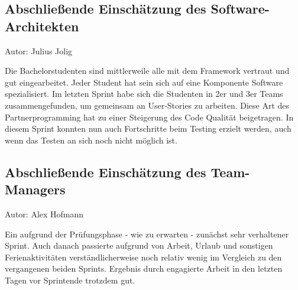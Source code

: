 \subsection{Abschließende Einschätzung des Software-Architekten}
{\small Autor: Julius Jolig}

Die Bachelorstudenten sind mittlerweile alle mit dem Framework vertraut und gut eingearbeitet. Jeder Student hat sein sich auf eine Komponente Software spezialisiert. Im letzten Sprint habe sich die Studenten in 2er und 3er Teams zusammengefunden, um gemeinsam an User-Stories zu arbeiten. Diese Art des Partnerprogramming hat zu einer Steigerung des Code Qualität beigetragen. In diesem Sprint konnten nun auch Fortschritte beim Testing erzielt werden, auch wenn das Testen an sich noch nicht möglich ist. 

\subsection{Abschließende Einschätzung des Team-Managers}
{\small Autor: Alex Hofmann}

Ein aufgrund der Prüfungsphase - wie zu erwarten - zunächst sehr verhaltener Sprint.
Auch danach passierte aufgrund von Arbeit, Urlaub und sonstigen Ferienaktivitäten verständlicherweise noch relativ wenig im Vergleich zu den vergangenen beiden Sprints. Ergebnis durch engagierte Arbeit in den letzten Tagen vor Sprintende trotzdem gut.

